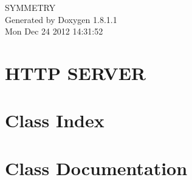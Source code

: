 \documentclass{book}
\begin{document}
\hypersetup{pageanchor=false,citecolor=blue}
\begin{titlepage}
\vspace*{7cm}
\begin{center}
{\Large S\-Y\-M\-M\-E\-T\-R\-Y }\\
\vspace*{1cm}
{\large Generated by Doxygen 1.8.1.1}\\
\vspace*{0.5cm}
{\small Mon Dec 24 2012 14:31:52}\\
\end{center}
\end{titlepage}
\clearemptydoublepage
{}
\tableofcontents
\clearemptydoublepage
{}
\hypersetup{pageanchor=true,citecolor=blue}
\chapter{H\-T\-T\-P S\-E\-R\-V\-E\-R}
\label{index}\hypertarget{index}{}
\chapter{Class Index}

\chapter{Class Documentation}









\printindex
\end{document}
